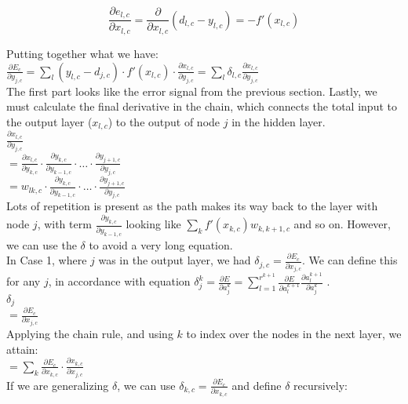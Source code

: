 \documentclass[conference]{IEEEtran}
\newcommand{\dd}[2]{\frac{\partial #1}{\partial #2}} %
\begin{document}
\begin{equation}
\dd{e_{l, c}}{x_{l, c}} = \dd{}{x_{l,c}}(d_{l,c} - y_{l, c}) = -f'(x_{l,c})
\end{equation}

Putting together what we have: \\

$\dd{E_{c}}{y_{j, c}} = \sum_{l}(y_{l, c} - d_{j, c}) \cdot f'(x_{l, c}) \cdot \dd{x_{l, c}}{y_{j, c}} = \sum_{l} \delta_{l, c} \dd{x_{l, c}}{y_{j, c}}$ \\

The first part looks like the error signal from the previous section. Lastly, we must calculate the final derivative in the chain, which connects the total input to the output layer ($x_{l, c}$) to the output of node $j$ in the hidden layer. \\

$\dd{x_{l, c}}{y_{j, c}}$ \\

$= \dd{x_{l, c}}{y_{k, c}} \cdot \dd{y_{k, c}}{y_{k-1, c}} \cdot \ldots \cdot \dd{y_{j+1, c}}{y_{j, c}}$ \\

$= w_{lk,c} \cdot \dd{y_{k, c}}{y_{k-1, c}} \cdot \ldots \cdot \dd{y_{j+1, c}}{y_{j, c}}$ \\

Lots of repetition is present as the path makes its way back to the layer with node $j$, with term $\dd{y_{k,c}}{y_{k-1,c}}$ looking like $\sum_{k}f'(x_{k,c})w_{k,k+1,c}$ and so on. However, we can use the $\delta$ to avoid a very long equation. \\

In Case 1, where $j$ was in the output layer, we had $\delta_{j, c} = \dd{E_{c}}{x_{j, c}}$. We can define this for any $j$, in accordance with equation $\delta_{j}^{k} = \dd{E}{a_{j}^{k}} = \sum_{l=1}^{r^{k+1}} \dd{E}{a_{l}^{k+1}} \dd{a_{l}^{k+1}}{a_{j}^{k}}$ \cite{b1}. \\

$\delta_{j}$ \\

$= \dd{E_{c}}{x_{j, c}}$ \\

Applying the chain rule, and using $k$ to index over the nodes in the next layer, we attain: \\

$= \sum_{k} \dd{E_{c}}{x_{k, c}} \cdot \dd{x_{k, c}}{x_{j, c}}$ \\

If we are generalizing $\delta$, we can use $\delta_{k, c} = \dd{E_{c}}{x_{k, c}}$ and define $\delta$ recursively: \\
\end{document}
